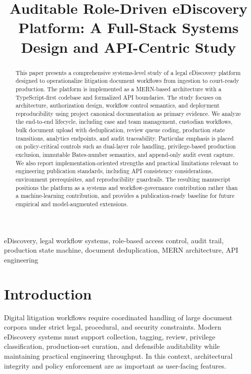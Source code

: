 \documentclass[conference]{IEEEtran}
\title{Auditable Role-Driven eDiscovery Platform: A Full-Stack Systems Design and API-Centric Study}
\author{\IEEEauthorblockN{Anonymous for Review}}
\begin{document}
\maketitle

\begin{abstract}
This paper presents a comprehensive systems-level study of a legal eDiscovery platform designed to operationalize litigation document workflows from ingestion to court-ready production. The platform is implemented as a MERN-based architecture with a TypeScript-first codebase and formalized API boundaries. The study focuses on architecture, authorization design, workflow control semantics, and deployment reproducibility using project canonical documentation as primary evidence. We analyze the end-to-end lifecycle, including case and team management, custodian workflows, bulk document upload with deduplication, review queue coding, production state transitions, analytics endpoints, and audit traceability. Particular emphasis is placed on policy-critical controls such as dual-layer role handling, privilege-based production exclusion, immutable Bates-number semantics, and append-only audit event capture. We also report implementation-oriented strengths and practical limitations relevant to engineering publication standards, including API consistency considerations, environment prerequisites, and reproducibility guardrails. The resulting manuscript positions the platform as a systems and workflow-governance contribution rather than a machine-learning contribution, and provides a publication-ready baseline for future empirical and model-augmented extensions.
\end{abstract}

\begin{IEEEkeywords}
eDiscovery, legal workflow systems, role-based access control, audit trail, production state machine, document deduplication, MERN architecture, API engineering
\end{IEEEkeywords}

\section{Introduction}
Digital litigation workflows require coordinated handling of large document corpora under strict legal, procedural, and security constraints. Modern eDiscovery systems must support collection, tagging, review, privilege classification, production-set curation, and defensible auditability while maintaining practical engineering throughput. In this context, architectural integrity and policy enforcement are as important as user-facing features.
\end{document}
